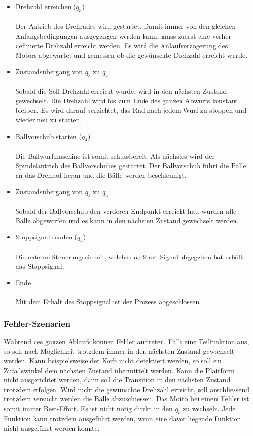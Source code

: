 \begin{itemize}
	\item Drehzahl erreichen ($q_{3}$) \\ \\
		 Der Antrieb des Drehrades wird gestartet. Damit immer von den gleichen Anfangsbedingungen ausgegangen werden kann, muss zuerst eine vorher definierte Drehzahl erreicht werden. Es wird die Anlaufverzögerung des Motors abgewartet und gemessen ob die gewünschte Drehzahl erreicht wurde.
	
	\item Zustandsübergang von $q_{3}$ zu $q_{4}$ \\ \\
		Sobald die Soll-Drehzahl erreicht wurde, wird in den nächsten Zustand gewechselt. Die Drehzahl wird bis zum Ende des ganzen Abwurfs konstant bleiben. Es wird darauf verzichtet, das Rad nach jedem Wurf zu stoppen und wieder neu zu starten.
		  
	\item Ballvorschub starten ($q_{4}$) \\ \\
		 Die Ballwurfmaschine ist somit schussbereit. Als nächstes wird der Spindelantrieb des Ballvorschubes gestartet. Der Ballvorschub führt die Bälle an das Drehrad heran und die Bälle werden beschleunigt. 
		  
	\item Zustandsübergang von $q_{4}$ zu $q_{5}$ \\ \\
		Sobald der Ballvorschub den vorderen Endpunkt erreicht hat, wurden alle Bälle abgeworfen und es kann in den nächsten Zustand gewechselt werden.
		  
	\item Stoppsignal senden ($q_{5}$) \\ \\
		Die externe Steuerungseinheit, welche das Start-Signal abgegeben hat erhält das Stoppsignal.
		  
	\item Ende \\ \\
		Mit dem Erhalt des Stoppsignal ist der Prozess abgeschlossen.
		  
\end{itemize}

\subsubsection{Fehler-Szenarien}
Während des ganzen Ablaufs können Fehler auftreten. Fällt eine Teilfunktion aus, so soll nach Möglichkeit trotzdem immer in den nächsten Zustand gewechselt werden. Kann beispielsweise der Korb nicht detektiert werden, so soll ein Zufallswinkel dem nächsten Zustand übermittelt werden. Kann die Plattform nicht ausgerichtet werden, dann soll die Transition in den nächsten Zustand trotzdem erfolgen. Wird nicht die gewünschte Drehzahl erreicht, soll anschliessend trotzdem versucht werden die Bälle abzuschiessen. Das Motto bei einem Fehler ist somit immer Best-Effort. Es ist nicht nötig direkt in den $q_{5}$ zu wechseln. Jede Funktion kann trotzdem ausgeführt werden, wenn eine davor liegende Funktion nicht ausgeführt werden konnte.